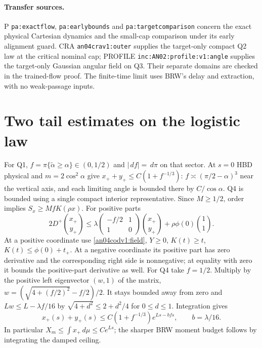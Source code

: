 \documentclass[11pt]{article}
\newcommand{\dd}{\,d}
\begin{document}
\paragraph{Transfer sources.}
P \texttt{pa:exactflow}, \texttt{pa:earlybounds} and
\texttt{pa:targetcomparison} concern the exact physical Cartesian
dynamics and the small-cap comparison under its early alignment
guard. CRA \texttt{an04crav1:outer} supplies the target-only compact
Q2 law at the critical nominal cap; PROFILE
\texttt{inc:AN02:profile:v1:angle} supplies the target-only Gaussian
angular field on Q3. Their separate domains are checked in the
trained-flow proof. The finite-time limit uses BRW's delay and
extraction, with no weak-passage inputs.

\section{Two tail estimates on the logistic law}
\label{an04codv1:tail}
For Q1, $f=\pi\{\tilde\alpha\ge\alpha\}\in(0,1/2)$ and
$|\dd f|=\dd\pi$ on that sector. At $s=0$ HBD physical and
$m=2\cos^2\alpha$ give $x_++y_+\le C(1+f^{-1/3})$:
$f\asymp(\pi/2-\alpha)^3$ near the vertical axis, and each
limiting angle is bounded there by $C/\cos\alpha$. Q4 is bounded
using a single compact interior representative. Since $M\ge1/2$,
order implies $S_x\ge MfK(\rho x)$. For positive parts
\[
 2D^+\binom{x_+}{y_+}\le
 \lambda\begin{pmatrix}-f/2&1\\1&0\end{pmatrix}\binom{x_+}{y_+}
       +\rho\phi(0)\binom11.
\]
At a positive coordinate use \eqref{an04codv1:field}, $Y\ge0$,
$K(t)\ge t$, $K(t)\le\phi(0)+t_+$. At a negative coordinate its
positive part has zero derivative and the corresponding right side
is nonnegative; at equality with zero it bounds the positive-part
derivative as well. For Q4 take $f=1/2$. Multiply by the positive
left eigenvector $(w,1)$ of the matrix, $w=(\sqrt{4+(f/2)^2}-f/2)/2$.
It stays bounded away from zero and $Lw\le L-\lambda f/16$
by $\sqrt{4+d^2}\le2+d^2/4$ for $0\le d\le1$. Integration gives
\begin{equation}\label{an04codv1:ceiling}
 x_+(s)+y_+(s)\le C(1+f^{-1/3})e^{Ls-bfs},\qquad b=\lambda/16 .
\end{equation}
In particular $X_m\le\int x_+\dd\mu\le C e^{Ls}$; the sharper
BRW moment budget follows by integrating the damped ceiling.
\end{document}
